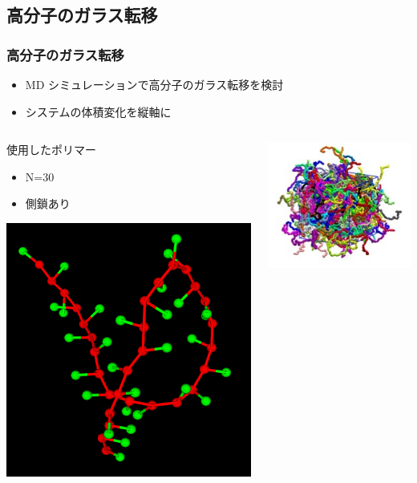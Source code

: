 \documentclass[12pt, dvipdfmx]{beamer}
\begin{document}
\subsection{高分子のガラス転移}
\begin{frame}
	\frametitle{高分子のガラス転移}
	\begin{itemize}
		\item MD シミュレーションで高分子のガラス転移を検討
		\item システムの体積変化を縦軸に
	\end{itemize}
	
	\vspace{-3mm}
	\begin{columns}[t, onlytextwidth]
			\begin{block}{使用したポリマー}
				\begin{itemize}
					\item N=30
					\item 側鎖あり
				\end{itemize}
				\centering
				\includegraphics[width=.7\textwidth]{N30_wSC1_single.png}
			\end{block}
		\begin{center}
			\centering
			\includegraphics[width=.4\textwidth]{polymer_image2.png}


\end{center}
\end{columns}
\end{frame}
\end{document}

